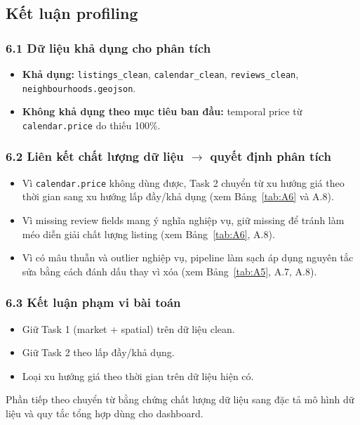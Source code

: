 \subsection{Kết luận profiling}

\subsubsection*{6.1 Dữ liệu khả dụng cho phân tích}

\begin{itemize}
    \item \textbf{Khả dụng:} \texttt{listings\_clean}, \texttt{calendar\_clean}, \texttt{reviews\_clean}, \texttt{neighbourhoods.geojson}.
    \item \textbf{Không khả dụng theo mục tiêu ban đầu:} temporal price từ \texttt{calendar.price} do thiếu 100\%.
\end{itemize}

\subsubsection*{6.2 Liên kết chất lượng dữ liệu $\rightarrow$ quyết định phân tích}

\begin{itemize}
    \item Vì \texttt{calendar.price} không dùng được, Task 2 chuyển từ xu hướng giá theo thời gian sang xu hướng lấp đầy/khả dụng (xem Bảng~\ref{tab:A6} và A.8).
    \item Vì missing review fields mang ý nghĩa nghiệp vụ, giữ missing để tránh làm méo diễn giải chất lượng listing (xem Bảng~\ref{tab:A6}, A.8).
    \item Vì có mâu thuẫn và outlier nghiệp vụ, pipeline làm sạch áp dụng nguyên tắc sửa bằng cách đánh dấu thay vì xóa (xem Bảng~\ref{tab:A5}, A.7, A.8).
\end{itemize}

\subsubsection*{6.3 Kết luận phạm vi bài toán}

\begin{itemize}
    \item Giữ Task 1 (market + spatial) trên dữ liệu clean.
    \item Giữ Task 2 theo lấp đầy/khả dụng.
    \item Loại xu hướng giá theo thời gian trên dữ liệu hiện có.
\end{itemize}

Phần tiếp theo chuyển từ bằng chứng chất lượng dữ liệu sang đặc tả mô hình dữ liệu và quy tắc tổng hợp dùng cho dashboard.
